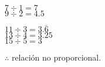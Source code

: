 \documentclass[12pt,addpoints,answers]{repaso}
\begin{document}
\begin{questions}
{\begin{multicols}{2}
\begin{parts}
                \begin{solutionbox}{2.5cm}\small%

                    \begin{multicols}{3}
                        $7\div 1=7$\\[-0.2em]
                        $9\div 2=4.5$\\[-0.2em]

                        \columnbreak%

                        $11\div 3=3.\overline{6}$\\[-0.2em]
                        $13\div 4=3.25$\\[-0.2em]
                        $15\div 5=3$

                        \columnbreak%

                        $\therefore$ relación no proporcional.
                    \end{multicols}
                \end{solutionbox}




\end{parts}
\end{multicols}}
\end{questions}
\end{document}
